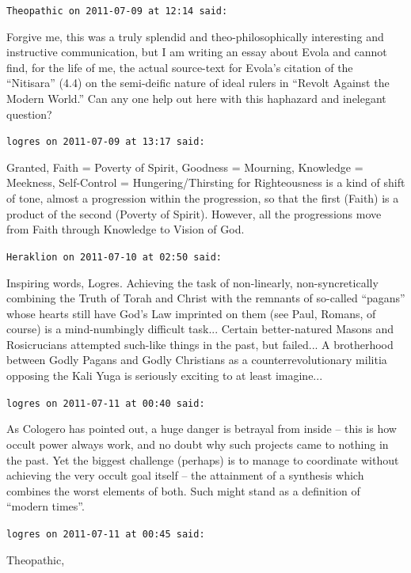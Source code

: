 \begin{footnotesize}
\begin{sffamily}
\texttt{Theopathic on 2011-07-09 at 12:14 said:}

Forgive me, this was a truly splendid and theo-philosophically interesting and instructive communication, but I am writing an essay about Evola and cannot find, for the life of me, the actual source-text for Evola's citation of the ``Nitisara'' (4.4) on the semi-deific nature of ideal rulers in ``Revolt Against the Modern World.'' Can any one help out here with this haphazard and inelegant question?

\hfill

\texttt{logres on 2011-07-09 at 13:17 said:}

Granted, Faith = Poverty of Spirit, Goodness = Mourning, Knowledge = Meekness, Self-Control = Hungering/Thirsting for Righteousness is a kind of shift of tone, almost a progression within the progression, so that the first (Faith) is a product of the second (Poverty of Spirit). However, all the progressions move from Faith through Knowledge to Vision of God.

\hfill

\texttt{Heraklion on 2011-07-10 at 02:50 said:}

Inspiring words, Logres. Achieving the task of non-linearly, non-syncretically combining the Truth of Torah and Christ with the remnants of so-called ``pagans'' whose hearts still have God's Law imprinted on them (see Paul, Romans, of course) is a mind-numbingly difficult task... Certain better-natured Masons and Rosicrucians attempted such-like things in the past, but failed... A brotherhood between Godly Pagans and Godly Christians as a counterrevolutionary militia opposing the Kali Yuga is seriously exciting to at least imagine... \hfill

\texttt{logres on 2011-07-11 at 00:40 said:}

As Cologero has pointed out, a huge danger is betrayal from inside -- this is how occult power always work, and no doubt why such projects came to nothing in the past. Yet the biggest challenge (perhaps) is to manage to coordinate without achieving the very occult goal itself -- the attainment of a synthesis which combines the worst elements of both. Such might stand as a definition of ``modern times''.

\hfill

\texttt{logres on 2011-07-11 at 00:45 said:}

Theopathic,


\end{sffamily}
\end{footnotesize}
